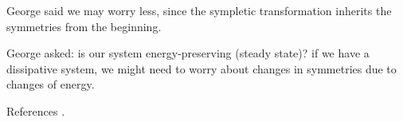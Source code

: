 \documentclass{article}
\begin{document}
George said we may worry less, since the sympletic transformation inherits the symmetries from the beginning.

George asked: is our system energy-preserving (steady state)?  if we have a dissipative system, we might need to worry about changes in symmetries due to changes of energy. 

References \cite{duruisseaux}.



\end{document}
